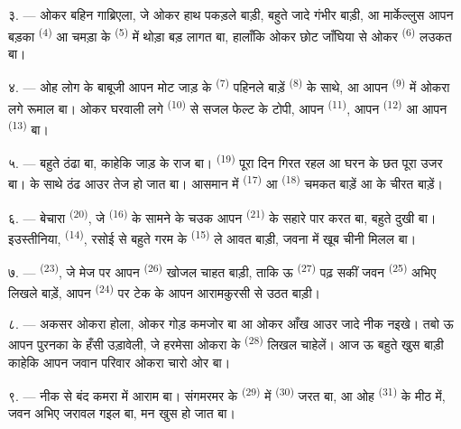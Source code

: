 ३. --- ओकर बहिन गाब्रिएला, जे ओकर हाथ पकड़ले बाड़ी, बहुते जादे
गंभीर बाड़ी, आ मार्केल्लुस आपन बड़का  \textsuperscript{(4)}
आ चमड़ा के  \textsuperscript{(5)} में थोड़ा बड़ लागत बा,
हालाँकि ओकर छोट जाँघिया से ओकर  \textsuperscript{(6)} लउकत
बा।

४. --- ओह लोग के बाबूजी आपन मोट जाड़ के 
\textsuperscript{(7)} पहिनले बाड़ें  \textsuperscript{(8)}
के साथे, आ आपन  \textsuperscript{(9)} में ओकरा लगे रूमाल बा।
ओकर घरवाली लगे  \textsuperscript{(10)} से सजल फेल्ट के टोपी,
आपन  \textsuperscript{(11)}, आपन 
\textsuperscript{(12)} आ आपन  \textsuperscript{(13)} बा।

५. --- बहुते ठंढा बा, काहेकि जाड़ के राज बा। 
\textsuperscript{(19)} पूरा दिन गिरत रहल आ घरन के छत पूरा उजर बा।
 के साथे ठंढ आउर तेज हो जात बा। आसमान में 
\textsuperscript{(17)} आ  \textsuperscript{(18)} चमकत
बाड़ें आ  के चीरत बाड़ें।

\VUsaut{4.2mm}
\VUsaut{3.0mm}

६. --- बेचारा  \textsuperscript{(20)}, जे
 \textsuperscript{(16)} के सामने के चउक आपन  \textsuperscript{(21)} के सहारे पार करत बा, बहुते दुखी बा।
इउस्तीनिया,  \textsuperscript{(14)}, रसोई से बहुते गरम
 के  \textsuperscript{(15)} ले आवत बाड़ी, जवना
में खूब चीनी मिलल बा।

७. ---  \textsuperscript{(23)}, जे मेज पर आपन 
\textsuperscript{(26)} खोजल चाहत बाड़ी, ताकि ऊ 
\textsuperscript{(27)} पढ़ सकीं जवन  \textsuperscript{(25)}
अभिए लिखले बाड़ें, आपन  \textsuperscript{(24)} पर टेक के आपन
आरामकुरसी से उठत बाड़ी।

८. --- अकसर ओकरा  होला,
ओकर गोड़ कमजोर बा आ ओकर आँख आउर जादे नीक नइखे। तबो ऊ आपन पुरनका
 के हँसी उड़ावेली, जे हरमेसा ओकरा के 
\textsuperscript{(28)} लिखल चाहेलें। आज ऊ बहुते खुस बाड़ी काहेकि आपन
जवान परिवार ओकरा चारो ओर बा।

९. --- नीक से बंद कमरा में आराम बा। संगमरमर के 
\textsuperscript{(29)} में  \textsuperscript{(30)} जरत
बा, आ ओह  \textsuperscript{(31)} के मीठ  में,
जवन अभिए जरावल गइल बा, मन खुस हो जात बा।

